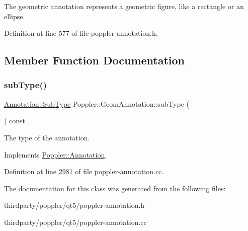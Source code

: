 The geometric annotation represents a geometric figure, like a rectangle or an ellipse. 

Definition at line 577 of file poppler-\/annotation.\+h.



\subsection{Member Function Documentation}
\mbox{\label{class_poppler_1_1_geom_annotation_a275700b4d5f06381f18ece403a1169d3}} 
\subsubsection{\texorpdfstring{sub\+Type()}{subType()}}
{\footnotesize\ttfamily \hyperlink{class_poppler_1_1_annotation_a2d592999c330949d64679cfa9e81113f}{Annotation\+::\+Sub\+Type} Poppler\+::\+Geom\+Annotation\+::sub\+Type (\begin{DoxyParamCaption}{ }\end{DoxyParamCaption}) const\hspace{0.3cm}{\ttfamily [virtual]}}

The type of the annotation. 

Implements \hyperlink{class_poppler_1_1_annotation_aef7fa1532193b41fbeba6e577579d984}{Poppler\+::\+Annotation}.



Definition at line 2981 of file poppler-\/annotation.\+cc.



The documentation for this class was generated from the following files\+:\begin{DoxyCompactItemize}
\item 
thirdparty/poppler/qt5/poppler-\/annotation.\+h\item 
thirdparty/poppler/qt5/poppler-\/annotation.\+cc\end{DoxyCompactItemize}
